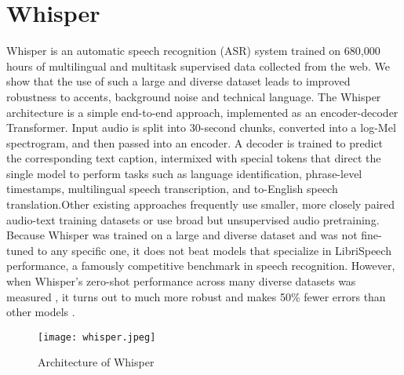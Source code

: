 \section{Whisper}
Whisper is an automatic speech recognition (ASR) system trained on 680,000 hours of multilingual and multitask supervised data collected from the web. We show that the use of such a large and diverse dataset leads to improved robustness to accents, background noise and technical language. The Whisper architecture is a simple end-to-end approach, implemented as an encoder-decoder Transformer. Input audio is split into 30-second chunks, converted into a log-Mel spectrogram, and then passed into an encoder. A decoder is trained to predict the corresponding text caption, intermixed with special tokens that direct the single model to perform tasks such as language identification, phrase-level timestamps, multilingual speech transcription, and to-English speech translation.Other existing approaches frequently use smaller, more closely paired audio-text training datasets or use broad but unsupervised audio pretraining. Because Whisper was trained on a large and diverse dataset and was not fine-tuned to any specific one, it does not beat models that specialize in LibriSpeech performance, a famously competitive benchmark in speech recognition. However, when   Whisper’s zero-shot performance across many diverse datasets was measured , it turns out to  much more robust and makes 50\% fewer errors than other models \cite{a2022_introducing}.

\begin{figure}[h]
    \centering
    \texttt{[image: whisper.jpeg]}
    \caption{Architecture of Whisper}
    \label{fig:whisper}
\end{figure}

\newpage